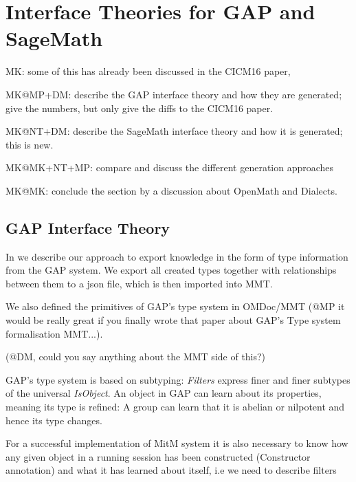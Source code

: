 \section{Interface Theories for GAP and SageMath}\label{sec:ift}
\begin{todolist}{MK: some of this has already been discussed in the CICM16 paper, }
\item MK@MP+DM: describe the GAP interface theory and how they are generated; give the
numbers, but only give the diffs to the CICM16 paper.

\item MK@NT+DM: describe the SageMath interface theory and how it is generated; this is
  new. 
\item MK@MK+NT+MP: compare and discuss the different generation approaches
\item MK@MK: conclude the section by a discussion about OpenMath and Dialects.
\end{todolist}


\subsection{GAP Interface Theory}

In \cite{DehKohKon:iop16} we describe our approach to export
knowledge in the form of type information from the GAP system. We export all
created types together with relationships between them to a json file, which is
then imported into MMT.

We also defined the primitives of GAP's type system in OMDoc/MMT (@MP it would
be really great if you finally wrote that paper about GAP's Type system formalisation MMT...).

(@DM, could you say anything about the MMT side of this?)

GAP's type system is based on subtyping: \emph{Filters} express finer and
finer subtypes of the universal \emph{IsObject}.
An object
in GAP can learn about its properties, meaning its type is refined: A group can
learn that it is abelian or
nilpotent and hence its type changes.

For a successful implementation of MitM system it is also necessary to
know how any given object in a running session has been constructed
(Constructor annotation) and what it has learned about itself, i.e we need to
describe filters


